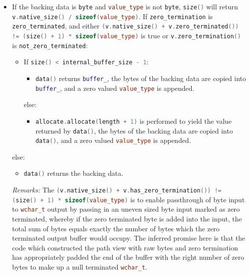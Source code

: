 \documentclass[11pt]{article}
\newcommand{\code}[2][cpp]{\lstinline[language=#1,basicstyle=\small\ttfamily]{#2}}
\newcommand{\desc}[1]{\textit{#1}}
\newcommand{\remarks}{\desc{Remarks: }}
\begin{document}
\begin{itemize}
    \item If the backing data is \code{byte} and \code{value_type} is not \code{byte}, \code{size()} will return \code{v.native_size() / sizeof(value_type)}. If \code{zero_termination} is \code{zero_terminated}, and either \code{(v.native_size() + v.zero_terminated()) != (size() + 1) * sizeof(value_type)} is true or \code{v.zero_termination()} is \code{not_zero_terminated}:
    \begin{itemize}
        \item If \code{size() < internal_buffer_size - 1}:
        \begin{itemize}
            \item \code{data()} returns \code{buffer_}, the bytes of the backing data are copied into \code{buffer_}, and a zero valued \code{value_type} is appended. 
        \end{itemize}
        else:
        \begin{itemize}
            \item \code{allocate.allocate(length + 1)} is performed to yield the value returned by \code{data()}, the bytes of the backing data are copied into \code{data()}, and a zero valued \code{value_type} is appended.
        \end{itemize}
    \end{itemize}
    else:
    \begin{itemize}
        \item \code{data()} returns the backing data.
    \end{itemize}

\remarks{The \code{(v.native_size() + v.has_zero_termination()) != (size() + 1) * sizeof(value_type)} is to enable passthrough of byte input to \code{wchar_t} output by passing in an uneven sized byte input marked as zero terminated, whereby if the zero terminated byte is added into the input, the total sum of bytes equals exactly the number of bytes which the zero terminated output buffer would occupy. The inferred promise here is that the code which constructed the path view with raw bytes and zero termination has appropriately padded the end of the buffer with the right number of zero bytes to make up a null terminated \code{wchar_t}.}


\end{itemize}
\end{document}
